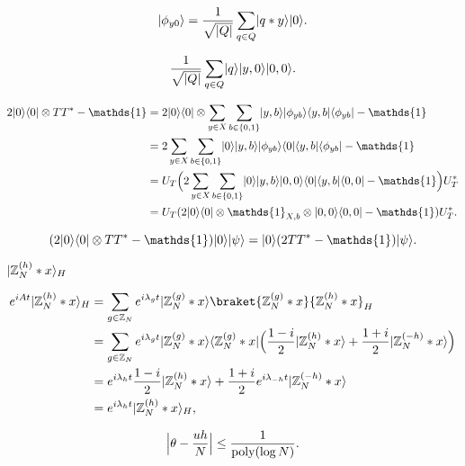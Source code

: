 \documentclass[11pt]{article}
\theoremstyle{definition}
\begin{document}
\[ \ket{\phi_{y0}} = \frac{1}{\sqrt{\abs{Q}}} \sum_{q \in Q} \ket{q * y} \ket{0}. \]


\[ \frac{1}{\sqrt{\abs{Q}}} \sum_{q \in Q} \ket{q} \ket{y, 0} \ket{0, 0}. \]


\begin{align*}
    2\ket{0} \bra{0} \otimes TT^* - \mathds{1}
    & = 2\ket{0} \bra{0} \otimes \sum_{y \in X} \sum_{b \in \{0, 1\}} \ket{y, b} \ket{\phi_{yb}} \bra{y, b} \bra{\phi_{yb}} - \mathds{1} \\
    & = 2\sum_{y \in X} \sum_{b \in \{0, 1\}} \ket{0} \ket{y, b} \ket{\phi_{yb}} \bra{0} \bra{y, b} \bra{\phi_{yb}} - \mathds{1} \\
    & = U_T \Big( 2\sum_{y \in X} \sum_{b \in \{0, 1\}} \ket{0} \ket{y, b} \ket{0, 0} \bra{0} \bra{y, b} \bra{0, 0} - \mathds{1} \Big) U_T^* \\
    & = U_T (2 \ket{0} \bra{0} \otimes \mathds{1}_{X, b} \otimes \ket{0, 0} \bra{0, 0} - \mathds{1}) U_T^*.
\end{align*}


\[ (2\ket{0} \bra{0} \otimes TT^* - \mathds{1}) \ket{0} \ket{\psi} = \ket{0} (2TT^* - \mathds{1}) \ket{\psi}. \]



$\ket{\Z_N^{(h)} * x}_H$


\begin{align*}
    e^{iAt} \ket{\Z_N^{(h)} * x}_H
    & = \sum_{g \in \Z_N} e^{i\lambda_gt} \ket{\Z_N^{(g)} * x} \braket{\Z_N^{(g)} * x}{\Z_N^{(h)} * x}_H \\
    & = \sum_{g \in \Z_N} e^{i\lambda_gt} \ket{\Z_N^{(g)} * x} \bra{\Z_N^{(g)} * x} \Big( \frac{1 - i}{2} \ket{\Z_N^{(h)} * x} + \frac{1 + i}{2} \ket{\Z_N^{(-h)} * x} \Big) \\
    & = e^{i\lambda_{h}t} \frac{1 - i}{2} \ket{\Z_N^{(h)} * x} + \frac{1 + i}{2} e^{i\lambda_{-h}t} \ket{\Z_N^{(-h)} * x} \\
    & = e^{i\lambda_{h}t} \ket{\Z_N^{(h)} * x}_H,
\end{align*}

\[ \abs[\Big]{\theta - \frac{uh}{N}} \le \frac{1}{\poly(\log N)}. \]
\end{document}
